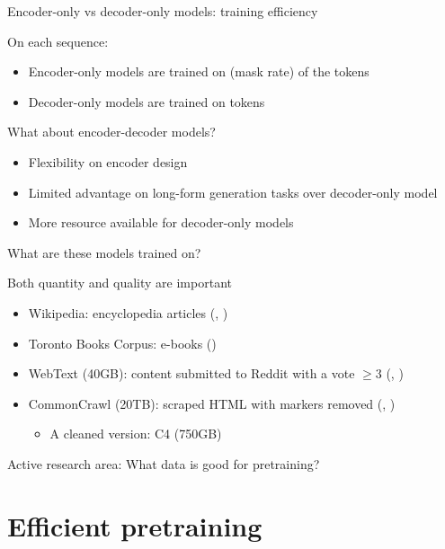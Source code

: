 \documentclass[usenames,dvipsnames,notes,11pt,aspectratio=169,hyperref={colorlinks=true, linkcolor=blue}]{beamer}
\begin{document}
\begin{frame}
    {Encoder-only vs decoder-only models: training efficiency}

    On each sequence: 
    \begin{itemize}
        \item Encoder-only models are trained on  (mask rate) of the tokens
        \item Decoder-only models are trained on  tokens 
    \end{itemize}

    \pause
    What about encoder-decoder models?
    \begin{itemize}
        \item Flexibility on encoder design
        \item Limited advantage on long-form generation tasks over decoder-only model 
        \item More resource available for decoder-only models 
    \end{itemize}
\end{frame}

\begin{frame}
    {What are these models trained on?}

    Both quantity and quality are important
    \begin{itemize}
        \item Wikipedia: encyclopedia articles (, )
        \item Toronto Books Corpus: e-books () 
        \item WebText (40GB): content submitted to Reddit with a vote $\ge 3$ (, ) 
        \item CommonCrawl (20TB): scraped HTML with markers removed (, )
            \begin{itemize}
                \item A cleaned version: C4 (750GB)
            \end{itemize}
    \end{itemize}

    Active research area: What data is good for pretraining? 
\end{frame}

\section{Efficient pretraining}
\end{document}
